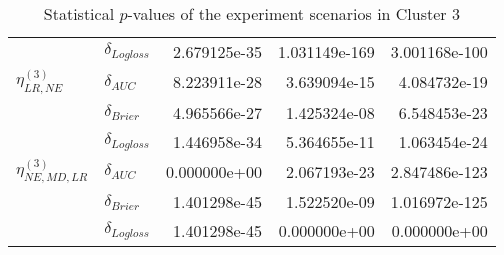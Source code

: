 \begin{table}[!h]
\begin{tabular}{l|lrrr}
                              & $\delta_{Logloss}$ &           2.679125e-35 &    1.031149e-169 &            3.001168e-100 \\
    $\eta^{(3)}_{LR, NE}$ & $\delta_{AUC}$ &           8.223911e-28 &     3.639094e-15 &             4.084732e-19 \\
                              & $\delta_{Brier}$ &           4.965566e-27 &     1.425324e-08 &             6.548453e-23 \\
                              & $\delta_{Logloss}$ &           1.446958e-34 &     5.364655e-11 &             1.063454e-24 \\
    $\eta^{(3)}_{NE, MD, LR}$ & $\delta_{AUC}$ &           0.000000e+00 &     2.067193e-23 &            2.847486e-123 \\
                              & $\delta_{Brier}$ &           1.401298e-45 &     1.522520e-09 &            1.016972e-125 \\
                              & $\delta_{Logloss}$ &           1.401298e-45 &     0.000000e+00 &             0.000000e+00 \\
    \bottomrule
    \end{tabular}
    \caption{Statistical $p$-values of the experiment scenarios in Cluster 3}
    \end{table}
    
